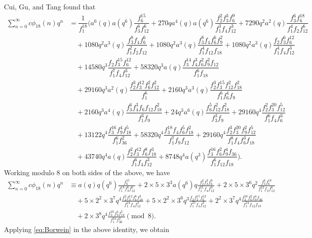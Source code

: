 \documentclass[12pt]{article}
\numberwithin{equation}{section}
\theoremstyle{plain}
\numberwithin{theorem}{section}
\theoremstyle{definition}
\theoremstyle{remark}
\begin{document}
     Cui, Gu, and Tang \cite[Theorem 3.13]{CGT25} found that
    \begin{align}
        \sum_{n=0}^\infty c\phi_{18}(n)q^n&=\dfrac{1}{f_1^{18}}\bigg (a^6(q)a(q^6) \dfrac{f_6^{15}}{f_3^6f_{12}^6}+270qa^4(q)a(q^6) \dfrac{f_2^2f_3^3f_6^9}{f_1^3f_4f_{12}^3} +7290q^2a^2(q)\dfrac{f_3^6f_6^{18}}{f_1^4f_2f_{12}^6}\nonumber \\&\quad +1080q^2a^3(q)\dfrac{f_3^8f_4f_6^6}{f_1^2f_2f_{12}} +1080q^2a^3(q)\dfrac{f_3^8f_4f_6^6f_9^2}{f_1^4f_{12}f_{18}} +1080q^2a^3(q)\dfrac{f_2f_3^6f_6^{12}}{f_1^4f_4f_{12}^3}\nonumber \\&\quad +14580q^3\dfrac{f_2f_3^{15}f_6^{12}}{f_1^7f_4f_{12}^3} +58320q^3a(q)\dfrac{f_3^{14}f_4^3f_6^2f_9^2f_{12}}{f_1^6f_{18}}\nonumber \\&\quad +29160q^3a^2(q)\dfrac{f_2^3f_3^{12}f_6^2f_{12}^2}{f_1^6} +2160q^3a^3(q)\dfrac{f_2^3f_3^{15}f_{12}^2f_{18}^2}{f_1^6f_6^4f_9}\nonumber \\&\quad +2160q^3a^4(q)\dfrac{f_3^6f_4^3f_6f_{12}f_{18}^2}{f_1^3f_9} +24q^3a^6(q)\dfrac{f_6^5f_{12}^2f_{18}^2}{f_3^3f_9}+29160q^4\dfrac{f_2^2f_3^{20}f_{12}^5}{f_1^6f_4f_6^3}\nonumber \\&\quad +13122q^4\dfrac{f_3^{16}f_9^4f_{18}^5}{f_1^6f_{36}^2} +58320q^4\dfrac{f_3^{18}f_4f_6^5f_{18}^2}{f_1^7f_9f_{12}} +29160q^4\dfrac{f_2^3f_3^{20}f_9^2f_{12}^5}{f_1^8f_4f_6^3f_{18}}\nonumber \\&\quad +43740q^4a(q)\dfrac{f_2^2f_3^{12}f_6^8f_{18}^3}{f_1^6f_4f_{12}^3} +8748q^4a(q^3)\dfrac{f_3^{16}f_6^2f_9^4f_{36}}{f_1^6f_{12}f_{18}}\bigg )\label{c 18 Gen}.
    \end{align}
    Working modulo 8 on both sides of the above, we have
    \begin{align*}
         \sum_{n=0}^\infty c\phi_{18}(n)q^n&\equiv a(q)q(q^6)\frac{f_6^{15}}{f_1^{18} f_3^6 f_{12}^6}+2\times 5\times 3^3a(q^6)q \frac{f_2^2 f_3^3 f_6^9}{f_1^{21} f_4 f_{12}^3}+2\times 5\times 3^6 q^2\frac{f_3^6 f_6^{18}}{f_1^{22} f_2 f_{12}^6}\\ &\quad +5\times 2^2\times 3^7q^4\frac{f_2^2 f_3^{12} f_6^8 f_{18}^3}{f_1^{24} f_4 f_{12}^3}+5\times 2^2\times 3^6q^3\frac{f_2 f_3^{15} f_6^{12}}{f_1^{25} f_4 f_{12}^3}+2^2 \times 3^7 q^4\frac{f_3^{16} f_6^2 f_9^4 f_{36}}{f_1^{24} f_{12} f_{18}}\\&\quad+2\times 3^8q^4\frac{f_3^{16} f_9^4 f_{18}^5}{f_1^{24} f_{36}^2}\pmod8.
    \end{align*}
    Applying \eqref{eq:Borwein} in the above identity, we obtain
\end{document}
